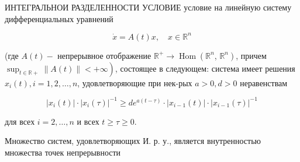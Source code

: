 \documentclass[10pt]{article}
\begin{document}
ИНТЕГРАЛЬНОИ РАЗДЕЛЕННОСТИ УСЛОВИЕ условие на линейную систему дифференциальных уравнений



\[

\dot{x}=A(t) x, \quad x \in \mathbb{R}^{n}

\]



(где $A(t)-$ непрерывное отображение $\mathbb{R}^{+} \rightarrow \operatorname{Hom}\left(\mathbb{R}^{n}\right.$, $\left.\mathbb{R}^{n}\right)$, причем $\left.\sup _{t \in \mathbb{R}+}\|A(t)\|<+\infty\right)$, состоящее в следующем: система имеет решения $x_{i}(t), i=1,2, \ldots, n$, удовлетворяющие при нек-рых $a>0, d>0$ неравенствам



\[

\left|x_{i}(t)\right| \cdot\left|x_{i}(\tau)\right|^{-1} \geqslant d e^{a(t-\tau)} \cdot\left|x_{i-1}(t)\right| \cdot\left|x_{i-1}(\tau)\right|^{-1}

\]



для всех $i=2, \ldots, n$ и всех $t \geqslant \tau \geqslant 0$.



Множество систем, удовлетворяющих И. р. у., является внутренностью множества точек непрерывности
\end{document}
